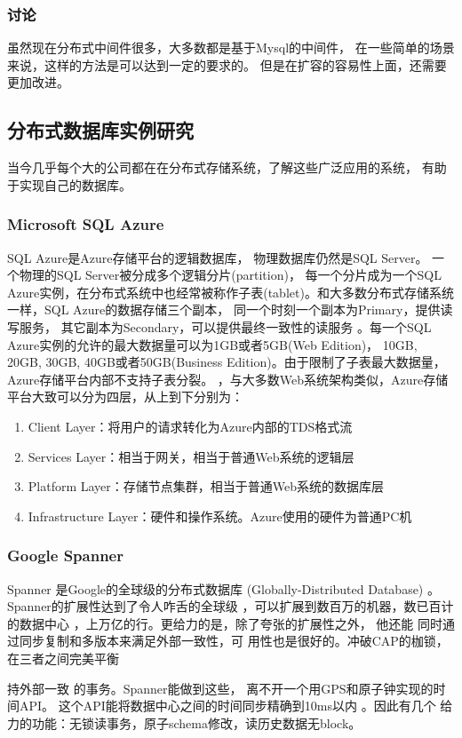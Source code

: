 \subsubsection{讨论}
虽然现在分布式中间件很多，大多数都是基于Mysql的中间件，
在一些简单的场景来说，这样的方法是可以达到一定的要求的。
但是在扩容的容易性上面，还需要更加改进。
\subsection{分布式数据库实例研究}
当今几乎每个大的公司都在在分布式存储系统，了解这些广泛应用的系统，
有助于实现自己的数据库。
\subsubsection{Microsoft SQL Azure}
SQL Azure是Azure存储平台的逻辑数据库，
物理数据库仍然是SQL Server。
一个物理的SQL Server被分成多个逻辑分片(partition)，
每一个分片成为一个SQL Azure实例，在分布式系统中也经常被称作子表(tablet)。和大多数分布式存储系统一样，SQL Azure的数据存储三个副本，
同一个时刻一个副本为Primary，提供读写服务，
其它副本为Secondary，可以提供最终一致性的读服务
。每一个SQL Azure实例的允许的最大数据量可以为1GB或者5GB(Web Edition)，
10GB, 20GB, 30GB, 40GB或者50GB(Business Edition)。由于限制了子表最大数据量，Azure存储平台内部不支持子表分裂。
，与大多数Web系统架构类似，Azure存储平台大致可以分为四层，从上到下分别为：

\begin{enumerate}
	\item Client Layer：将用户的请求转化为Azure内部的TDS格式流
	\item Services Layer：相当于网关，相当于普通Web系统的逻辑层
	\item Platform Layer：存储节点集群，相当于普通Web系统的数据库层
	\item Infrastructure Layer：硬件和操作系统。Azure使用的硬件为普通PC机
\end{enumerate}
\subsubsection{Google Spanner}
Spanner 是Google的全球级的分布式数据库 (Globally-Distributed Database) 。
Spanner的扩展性达到了令人咋舌的全球级
，可以扩展到数百万的机器，数已百计的数据中心
，上万亿的行。更给力的是，除了夸张的扩展性之外，
他还能 同时通过同步复制和多版本来满足外部一致性，可
用性也是很好的。冲破CAP的枷锁，在三者之间完美平衡

持外部一致 的事务。Spanner能做到这些，
离不开一个用GPS和原子钟实现的时间API。
这个API能将数据中心之间的时间同步精确到10ms以内
。因此有几个 给力的功能：无锁读事务，原子schema修改，读历史数据无block。
